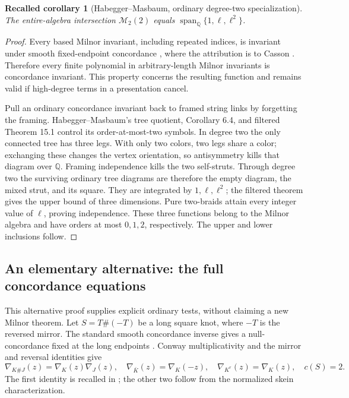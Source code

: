 \documentclass[11pt]{article}
\newtheorem{corollary}[theorem]{Recalled corollary}
\theoremstyle{remark}\newtheorem{remark}[theorem]{Remark}
\newcommand{\Q}{\mathbb Q}
\newcommand{\M}{\mathcal M}
\begin{document}
\begin{corollary}[Habegger--Masbaum, ordinary degree-two specialization]
\label{cor:milnor}
The entire-algebra intersection $\M_2(2)$ equals
$\operatorname{span}_{\Q}\{1,\ell,\ell^2\}$.
\end{corollary}
\begin{proof}
Every based Milnor invariant, including repeated indices, is invariant
under smooth fixed-endpoint concordance
\cite[\S2.1.4 and \S5.1]{MY09}, where the attribution is to Casson
\cite{Casson}. Therefore every finite polynomial in arbitrary-length
Milnor invariants is concordance invariant. This property concerns the
resulting function and remains valid if high-degree terms in a presentation
cancel.

Pull an ordinary concordance invariant back to framed string links by
forgetting the framing. Habegger--Masbaum's tree quotient, Corollary 6.4,
and filtered Theorem 15.1 \cite[\S4 and \S15]{HM} control its order-at-most-two
symbols. In degree two the only connected tree has three legs. With only
two colors, two legs share a color; exchanging these changes the vertex
orientation, so antisymmetry kills that diagram over $\Q$. Framing
independence kills the two self-struts. Through degree two the surviving
ordinary tree diagrams are therefore the empty diagram, the mixed strut,
and its square. They are integrated by $1,\ell,\ell^2$; the filtered theorem
gives the upper bound of three dimensions. Pure two-braids attain every
integer value of $\ell$, proving independence. These three functions belong
to the Milnor algebra and have orders at most $0,1,2$, respectively. The
upper and lower inclusions follow.
\end{proof}

\subsection{An elementary alternative: the full concordance equations}
This alternative proof supplies explicit ordinary tests, without claiming
a new Milnor theorem. Let $S=T\#(-T)$ be a long square knot, where $-T$ is
the reversed mirror. The standard smooth concordance inverse gives a
null-concordance fixed at the long endpoints
\cite[pp.~1--2]{CochranHarvey}. Conway multiplicativity and the mirror and
reversal identities give
\begin{equation}\label{eq:square}
\nabla_{K\#J}(z)=\nabla_K(z)\nabla_J(z),\quad
\nabla_{\bar K}(z)=\nabla_K(-z),\quad
\nabla_{K^r}(z)=\nabla_K(z),\quad c(S)=2.
\end{equation}
The first identity is recalled in \cite[\S1]{Conant}; the other two follow
from the normalized skein characterization.
\end{document}
